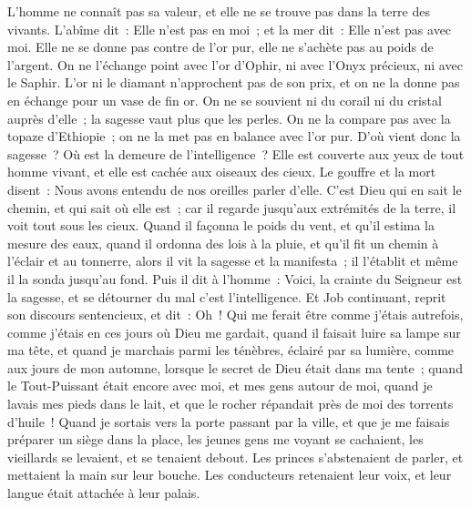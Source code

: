 \begin{multicols}{2}
L'homme ne connaît pas sa valeur, et elle ne se trouve pas dans la terre des vivants.
L'abîme dit~: Elle n'est pas en moi~; et la mer dit~: Elle n'est pas avec moi.
Elle ne se donne pas contre de l'or pur, elle ne s'achète pas au poids de l'argent.
On ne l'échange point avec l'or d'Ophir, ni avec l'Onyx précieux, ni avec le Saphir.
L'or ni le diamant n'approchent pas de son prix, et on ne la donne pas en échange pour un vase de fin or.
On ne se souvient ni du corail ni du cristal auprès d'elle~; la sagesse vaut plus que les perles.
On ne la compare pas avec la topaze d'Ethiopie~; on ne la met pas en balance avec l'or pur.
D'où vient donc la sagesse~? Où est la demeure de l'intelligence~?
Elle est couverte aux yeux de tout homme vivant, et elle est cachée aux oiseaux des cieux.
Le gouffre et la mort disent~: Nous avons entendu de nos oreilles parler d'elle.
C'est Dieu qui en sait le chemin, et qui sait où elle est~;
car il regarde jusqu'aux extrémités de la terre, il voit tout sous les cieux.
Quand il façonna le poids du vent, et qu'il estima la mesure des eaux,
quand il ordonna des lois à la pluie, et qu'il fit un chemin à l'éclair et au tonnerre,
alors il vit la sagesse et la manifesta~; il l'établit et même il la sonda jusqu'au fond.
Puis il dit à l'homme~: Voici, la crainte du Seigneur est la sagesse, et se détourner du mal c'est l'intelligence.
\VerseOne{} Et Job continuant, reprit son discours sentencieux, et dit~:
Oh~! Qui me ferait être comme j'étais autrefois, comme j'étais en ces jours où Dieu me gardait,
quand il faisait luire sa lampe sur ma tête, et quand je marchais parmi les ténèbres, éclairé par sa lumière,
comme aux jours de mon automne, lorsque le secret de Dieu était dans ma tente~;
quand le Tout-Puissant était encore avec moi, et mes gens autour de moi,
quand je lavais mes pieds dans le lait, et que le rocher répandait près de moi des torrents d'huile~!
Quand je sortais vers la porte passant par la ville, et que je me faisais préparer un siège dans la place,
les jeunes gens me voyant se cachaient, les vieillards se levaient, et se tenaient debout.
Les princes s'abstenaient de parler, et mettaient la main sur leur bouche.
Les conducteurs retenaient leur voix, et leur langue était attachée à leur palais.

\end{multicols}
